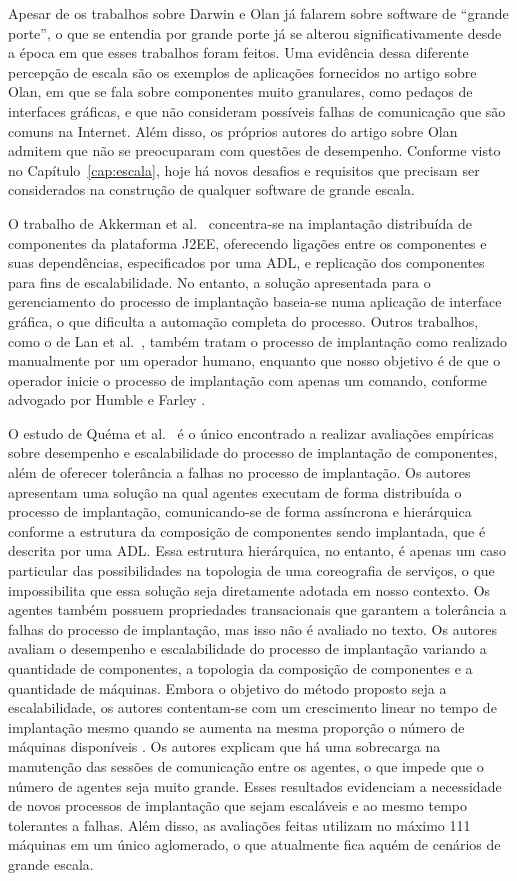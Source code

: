 Apesar de os trabalhos sobre Darwin e Olan já falarem sobre software de ``grande porte'', o que se entendia por grande porte já se alterou significativamente desde a época em que esses trabalhos foram feitos. Uma evidência dessa diferente percepção de escala são os exemplos de aplicações fornecidos no artigo sobre Olan, em que se fala sobre componentes muito granulares, como pedaços de interfaces gráficas, e que não consideram possíveis falhas de comunicação que são comuns na Internet. Além disso, os próprios autores do artigo sobre Olan admitem que não se preocuparam com questões de desempenho. Conforme visto no Capítulo~\ref{cap:escala}, hoje há novos desafios e requisitos que precisam ser considerados na construção de qualquer software de grande escala.

O trabalho de Akkerman et al.~\cite{Akkerman2005J2EE} concentra-se na implantação distribuída de componentes da plataforma J2EE, oferecendo ligações entre os componentes e suas dependências, especificados por uma ADL, e replicação dos componentes para fins de escalabilidade. No entanto, a solução apresentada para o gerenciamento do processo de implantação baseia-se numa aplicação de interface gráfica, o que dificulta a automação completa do processo. Outros trabalhos, como o de Lan et al.~\cite{Lan2005Architecture}, também tratam o processo de implantação como realizado manualmente por um operador humano, enquanto que nosso objetivo é de que o operador inicie o processo de implantação com apenas um comando, conforme advogado por Humble e Farley \cite{Humble2011Continuous}.

O estudo de Quéma et al.~\cite{quema2004hierarchical} é o único encontrado a realizar avaliações empíricas sobre desempenho e escalabilidade do processo de implantação de componentes, além de oferecer tolerância a falhas no processo de implantação. Os autores apresentam uma solução na qual agentes executam de forma distribuída o processo de implantação, comunicando-se de forma assíncrona e hierárquica conforme a estrutura da composição de componentes sendo implantada, que é descrita por uma ADL. Essa estrutura hierárquica, no entanto, é apenas um caso particular das possibilidades na topologia de uma coreografia de serviços, o que impossibilita que essa solução seja diretamente adotada em nosso contexto. Os agentes também possuem propriedades transacionais que garantem a tolerância a falhas do processo de implantação, mas isso não é avaliado no texto. Os autores avaliam o desempenho e escalabilidade do processo de implantação variando a quantidade de componentes, a topologia da composição de componentes e a quantidade de máquinas. Embora o objetivo do método proposto seja a escalabilidade, os autores contentam-se com um crescimento linear no tempo de implantação mesmo quando se aumenta na mesma proporção o número de máquinas disponíveis . Os autores explicam que há uma sobrecarga na manutenção das sessões de comunicação entre os agentes, o que impede que o número de agentes seja muito grande. Esses resultados evidenciam a necessidade de novos processos de implantação que sejam escaláveis e ao mesmo tempo tolerantes a falhas. Além disso, as avaliações feitas utilizam no máximo 111 máquinas em um único aglomerado, o que atualmente fica aquém de cenários de grande escala. 

